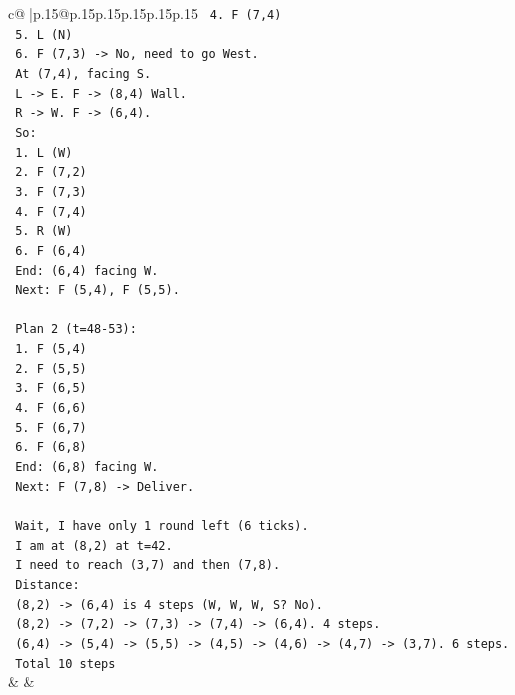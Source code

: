 \documentclass{article}
\begin{document}
{\begin{supertabular}{c@{$\;$}|p{.15\linewidth}@{}p{.15\linewidth}p{.15\linewidth}p{.15\linewidth}p{.15\linewidth}p{.15\linewidth}}
{{{\texttt{  4. F (7,4)} \\
\texttt{  5. L (N)} \\
\texttt{  6. F (7,3) {-}> No, need to go West.} \\
\texttt{  At (7,4), facing S.} \\
\texttt{  L {-}> E. F {-}> (8,4) Wall.} \\
\texttt{  R {-}> W. F {-}> (6,4).} \\
\texttt{  So:} \\
\texttt{  1. L (W)} \\
\texttt{  2. F (7,2)} \\
\texttt{  3. F (7,3)} \\
\texttt{  4. F (7,4)} \\
\texttt{  5. R (W)} \\
\texttt{  6. F (6,4)} \\
\texttt{  End: (6,4) facing W.} \\
\texttt{  Next: F (5,4), F (5,5).} \\
\\ 
\texttt{  Plan 2 (t=48{-}53):} \\
\texttt{  1. F (5,4)} \\
\texttt{  2. F (5,5)} \\
\texttt{  3. F (6,5)} \\
\texttt{  4. F (6,6)} \\
\texttt{  5. F (6,7)} \\
\texttt{  6. F (6,8)} \\
\texttt{  End: (6,8) facing W.} \\
\texttt{  Next: F (7,8) {-}> Deliver.} \\
\\ 
\texttt{  Wait, I have only 1 round left (6 ticks).} \\
\texttt{  I am at (8,2) at t=42.} \\
\texttt{  I need to reach (3,7) and then (7,8).} \\
\texttt{  Distance:} \\
\texttt{  (8,2) {-}> (6,4) is 4 steps (W, W, W, S? No).} \\
\texttt{  (8,2) {-}> (7,2) {-}> (7,3) {-}> (7,4) {-}> (6,4). 4 steps.} \\
\texttt{  (6,4) {-}> (5,4) {-}> (5,5) {-}> (4,5) {-}> (4,6) {-}> (4,7) {-}> (3,7). 6 steps.} \\
\texttt{  Total 10 steps} \\
            }
        }
    }
    & & \\ \\


\end{supertabular}}
\end{document}
